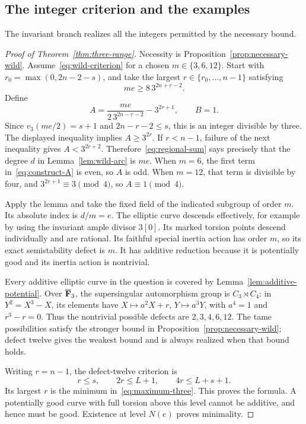 \subsection{The integer criterion and the examples}
The invariant branch realizes all the integers permitted by the necessary bound.

\begin{proof}[Proof of Theorem~\ref{thm:three-range}]
Necessity is Proposition~\ref{prop:necessary-wild}. Assume~\eqref{eq:wild-criterion} for a chosen $m\in\{3,6,12\}$. Start with $r_0=\max(0,2n-2-s)$, and take the largest $r\in\{r_0,\ldots,n-1\}$ satisfying
\[
 me\ge8\,3^{2n+r-2}.
\]
Define
\begin{equation}\label{eq:construct-A}
 A=\frac{me}{2\,3^{2n-r-2}}-3^{2r+1},\qquad B=1.
\end{equation}
Since $v_3(me/2)=s+1$ and $2n-r-2\le s$, this is an integer divisible by three. The displayed inequality implies $A\ge3^{2r}$. If $r<n-1$, failure of the next inequality gives $A<3^{2r+2}$. Therefore~\eqref{eq:regional-sum} says precisely that the degree $d$ in Lemma~\ref{lem:wild-arc} is $me$. When $m=6$, the first term in~\eqref{eq:construct-A} is even, so $A$ is odd. When $m=12$, that term is divisible by four, and $3^{2r+1}\equiv3\pmod4$, so $A\equiv1\pmod4$.

Apply the lemma and take the fixed field of the indicated subgroup of order $m$. Its absolute index is $d/m=e$. The elliptic curve descends effectively, for example by using the invariant ample divisor $3[0]$. Its marked torsion points descend individually and are rational. Its faithful special inertia action has order $m$, so its exact semistability defect is $m$. It has additive reduction because it is potentially good and its inertia action is nontrivial.

Every additive elliptic curve in the question is covered by Lemma~\ref{lem:additive-potential}. Over $\overline{\mathbf F}_3$, the supersingular automorphism group is $C_3\rtimes C_4$: in $Y^2=X^3-X$, its elements have $X\mapsto a^2X+r$, $Y\mapsto a^3Y$, with $a^4=1$ and $r^3-r=0$. Thus the nontrivial possible defects are $2,3,4,6,12$. The tame possibilities satisfy the stronger bound in Proposition~\ref{prop:necessary-wild}; defect twelve gives the weakest bound and is always realized when that bound holds.

Writing $r=n-1$, the defect-twelve criterion is
\[
 r\le s,\qquad 2r\le L+1,\qquad 4r\le L+s+1.
\]
Its largest $r$ is the minimum in~\eqref{eq:maximum-three}. This proves the formula. A potentially good curve with full torsion above this level cannot be additive, and hence must be good. Existence at level $N(e)$ proves minimality.
\end{proof}

